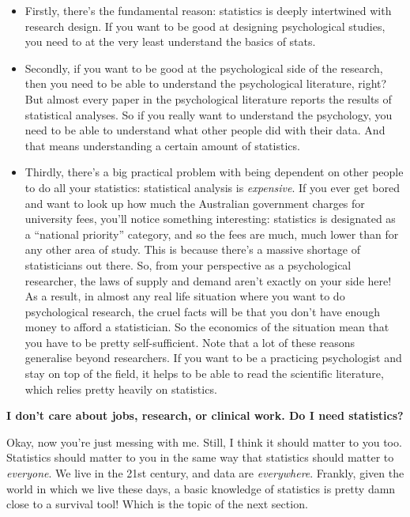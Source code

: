 \documentclass[
]{book}
\providecommand{\tightlist}{%
  \setlength{\itemsep}{0pt}\setlength{\parskip}{0pt}}
\begin{document}
\begin{itemize}
\tightlist
\item
  Firstly, there's the fundamental reason: statistics is deeply intertwined with research design. If you want to be good at designing psychological studies, you need to at the very least understand the basics of stats.
\item
  Secondly, if you want to be good at the psychological side of the research, then you need to be able to understand the psychological literature, right? But almost every paper in the psychological literature reports the results of statistical analyses. So if you really want to understand the psychology, you need to be able to understand what other people did with their data. And that means understanding a certain amount of statistics.
\item
  Thirdly, there's a big practical problem with being dependent on other people to do all your statistics: statistical analysis is \emph{expensive}. If you ever get bored and want to look up how much the Australian government charges for university fees, you'll notice something interesting: statistics is designated as a ``national priority'' category, and so the fees are much, much lower than for any other area of study. This is because there's a massive shortage of statisticians out there. So, from your perspective as a psychological researcher, the laws of supply and demand aren't exactly on your side here! As a result, in almost any real life situation where you want to do psychological research, the cruel facts will be that you don't have enough money to afford a statistician. So the economics of the situation mean that you have to be pretty self-sufficient.
  Note that a lot of these reasons generalise beyond researchers. If you want to be a practicing psychologist and stay on top of the field, it helps to be able to read the scientific literature, which relies pretty heavily on statistics.
\end{itemize}

\textbf{I don't care about jobs, research, or clinical work. Do I need statistics?}

Okay, now you're just messing with me. Still, I think it should matter to you too. Statistics should matter to you in the same way that statistics should matter to \emph{everyone}. We live in the 21st century, and data are \emph{everywhere}. Frankly, given the world in which we live these days, a basic knowledge of statistics is pretty damn close to a survival tool! Which is the topic of the next section.
\end{document}
